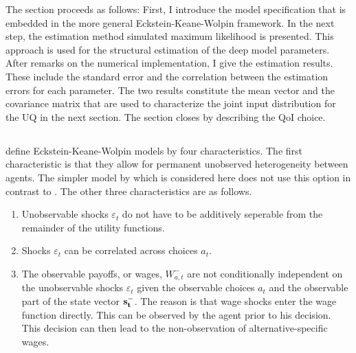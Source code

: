The section proceeds as follows: First, I introduce the  \cite{Keane.1994} model specification that is embedded in the more general Eckstein-Keane-Wolpin framework. In the next step, the estimation method simulated maximum likelihood is presented. This approach is used for the structural estimation of the deep model parameters. After remarks on the numerical implementation, I give the estimation results. These include the standard error and the correlation between the estimation errors for each parameter. The two results constitute the mean vector and the covariance matrix that are used to characterize the joint input distribution for the UQ in the next section. The section closes by describing the QoI choice.

\subsection{\cite{Keane.1994}}

\cite{Aguirregabiria.2010} define Eckstein-Keane-Wolpin models by four characteristics. The first characteristic is that they allow for permanent unobserved heterogeneity between agents. The simpler model by \cite{Keane.1994} which is considered here does not use this option in contrast to \cite{Keane.1997}. The other three characteristics are as follows.
\begin{enumerate}
\item Unobservable shocks $\varepsilon_t$ do not have to be additively seperable from the remainder of the utility functions.
\item Shocks $\varepsilon_t$ can be correlated across choices $a_t$.
\item The observable payoffs, or wages, $W_{a,t}^{-}$ are not conditionally independent on the unobservable shocks $\varepsilon_t$ given the observable choices $a_t$ and the observable part of the state vector $\bold{s_t^-}$. The reason is that wage shocks enter the wage function directly. This can be observed by the agent prior to his decision. This decision can then lead to the non-observation of alternative-specific wages. 
\end{enumerate}

